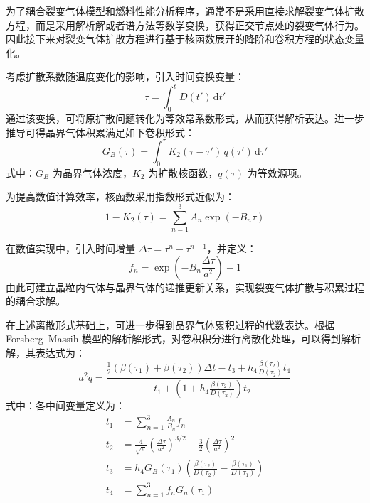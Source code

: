 为了耦合裂变气体模型和燃料性能分析程序，通常不是采用直接求解裂变气体扩散方程，而是采用解析解或者谱方法等数学变换，获得正交节点处的裂变气体行为。因此接下来对裂变气体扩散方程进行基于核函数展开的降阶和卷积方程的状态变量化。

考虑扩散系数随温度变化的影响，引入时间变换变量：
\begin{equation}
	\tau = \int_0^t D(t') \, \mathrm{d}t'
\end{equation}
通过该变换，可将原扩散问题转化为等效常系数形式，从而获得解析表达。进一步推导可得晶界气体积累满足如下卷积形式：
\begin{equation}
	G_B(\tau) = \int_0^\tau K_2(\tau - \tau')\, q(\tau')\, \mathrm{d}\tau'
\end{equation}
\noindent 式中：$G_B$ 为晶界气体浓度，$K_2$ 为扩散核函数，$q(\tau)$ 为等效源项。

为提高数值计算效率，核函数采用指数形式近似为：
\begin{equation}
	1 - K_2(\tau) = \sum_{n=1}^{3} A_n \exp(-B_n \tau)
\end{equation}

在数值实现中，引入时间增量 $\Delta\tau = \tau^{n} - \tau^{n-1}$，并定义：
\begin{equation}
	f_n = \exp\left(-B_n \frac{\Delta\tau}{a^2}\right) - 1
\end{equation}
由此可建立晶粒内气体与晶界气体的递推更新关系，实现裂变气体扩散与积累过程的耦合求解。

在上述离散形式基础上，可进一步得到晶界气体累积过程的代数表达。根据 Forsberg--Massih 模型的解析解形式，对卷积积分进行离散化处理，可以得到解析解，其表达式为：
\begin{equation}
	a^2q =
	\frac{
		\frac{1}{2}\left(\beta(\tau_1)+\beta(\tau_2)\right)\Delta t
		- t_3
		+ h_4 \frac{\beta(\tau_2)}{D(\tau_2)} t_4
	}{
		- t_1 + \left(1 + h_4 \frac{\beta(\tau_2)}{D(\tau_2)}\right) t_2
	}
\end{equation}
\noindent 式中：各中间变量定义为：
\begin{align}
	t_1 & = \sum_{n=1}^{3} \frac{A_n}{B_n} f_n                                                            \\
	t_2 & = \frac{4}{\sqrt{\pi}}\left(\frac{\Delta\tau}{a^2}\right)^{3/2}
	- \frac{3}{2}\left(\frac{\Delta\tau}{a^2}\right)^2                                                    \\
	t_3 & = h_4 G_B(\tau_1)\left(\frac{\beta(\tau_2)}{D(\tau_2)} - \frac{\beta(\tau_1)}{D(\tau_1)}\right) \\
	t_4 & = \sum_{n=1}^{3} f_n G_n(\tau_1)
\end{align}

